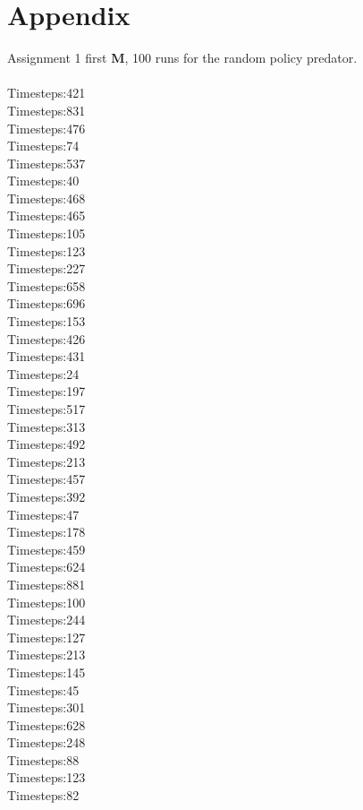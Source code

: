 \documentclass{article}
\begin{document}
\newpage
\section{Appendix}
Assignment 1 first \textbf{M}, 100 runs for the random policy predator.\\\\
Timesteps:421\\
Timesteps:831\\
Timesteps:476\\
Timesteps:74\\
Timesteps:537\\
Timesteps:40\\
Timesteps:468\\
Timesteps:465\\
Timesteps:105\\
Timesteps:123\\
Timesteps:227\\
Timesteps:658\\
Timesteps:696\\
Timesteps:153\\
Timesteps:426\\
Timesteps:431\\
Timesteps:24\\
Timesteps:197\\
Timesteps:517\\
Timesteps:313\\
Timesteps:492\\
Timesteps:213\\
Timesteps:457\\
Timesteps:392\\
Timesteps:47\\
Timesteps:178\\
Timesteps:459\\
Timesteps:624\\
Timesteps:881\\
Timesteps:100\\
Timesteps:244\\
Timesteps:127\\
Timesteps:213\\
Timesteps:145\\
Timesteps:45\\
Timesteps:301\\
Timesteps:628\\
Timesteps:248\\
Timesteps:88\\
Timesteps:123\\
Timesteps:82\\
\end{document}

